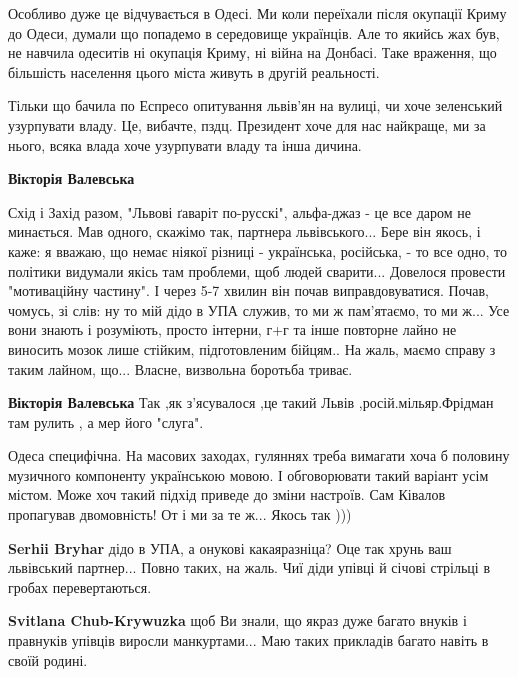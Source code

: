 \begin{itemize}

Особливо дуже це відчувається в Одесі. Ми коли переїхали після окупації Криму до
Одеси, думали що попадемо в середовище українців. Але то якийсь жах був, не
навчила одеситів ні окупація Криму, ні війна на Донбасі. Таке враження, що
більшість населення цього міста живуть в другій реальності.



Тільки що бачила по Еспресо опитування львів'ян на вулиці, чи хоче зеленський
узурпувати владу. Це, вибачте, пздц. Президент хоче для нас найкраще, ми за
нього, всяка влада хоче узурпувати владу та інша дичина.

\begin{itemize} %
\textbf{Вікторія Валевська} 

Схід і Захід разом, "Львові ґаваріт по-русскі", альфа-джаз - це все даром не
минається. Мав одного, скажімо так, партнера львівського... Бере він якось, і
каже: я вважаю, що немає ніякої різниці - українська, російська, - то все одно,
то політики видумали якісь там проблеми, щоб людей сварити... Довелося провести
"мотиваційну частину". І через 5-7 хвилин він почав виправдовуватися. Почав,
чомусь, зі слів: ну то мій дідо в УПА служив, то ми ж пам'ятаємо, то ми ж...
Усе вони знають і розуміють, просто інтерни, г+г та інше повторне лайно не
виносить мозок лише стійким, підготовленим бійцям.. На жаль, маємо справу з
таким лайном, що... Власне, визвольна боротьба триває.

\textbf{Вікторія Валевська} Так ,як з'ясувалося ,це такий Львів ,росій.мільяр.Фрідман там рулить , а мер його "слуга".


Одеса специфічна. На масових заходах, гуляннях треба вимагати хоча б половину
музичного компоненту українською мовою. І обговорювати такий варіант усім
містом. Може хоч такий підхід приведе до зміни настроїв. Сам Ківалов пропагував
двомовність! От і ми за те ж... Якось так )))

\textbf{Serhii Bryhar} дідо в УПА, а онукові какаяразніца? Оце так хрунь ваш львівський партнер...
Повно таких, на жаль. Чиї діди упівці й січові стрільці в гробах перевертаються.

\textbf{Svitlana Chub-Krywuzka} щоб Ви знали, що якраз дуже багато внуків і правнуків упівців виросли манкуртами... Маю таких прикладів багато навіть в своїй родині.


\end{itemize}
\end{itemize}
